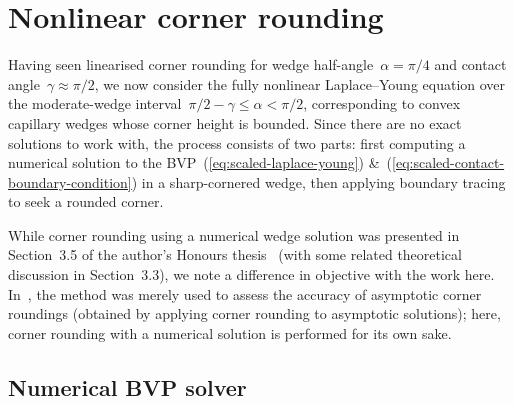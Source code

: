 \section{Nonlinear corner rounding}
\label{sec:moderate.nonlinear}

Having seen linearised corner rounding
for wedge half-angle~$\alpha = \pi/4$
and contact angle~$\gamma \approx \pi/2$,
we now consider the fully nonlinear Laplace--Young equation
over the moderate-wedge interval~$\pi/2 - \gamma \le \alpha < \pi/2$,
corresponding to convex capillary wedges whose corner height is bounded.
Since there are no exact solutions to work with,
the process consists of two parts:
first computing a numerical solution
to the BVP~(\ref{eq:scaled-laplace-young})
\&~(\ref{eq:scaled-contact-boundary-condition})
in a sharp-cornered wedge,
then applying boundary tracing to seek a rounded corner.

While corner rounding using a numerical wedge solution
was presented in Section~3.5
of the author's Honours thesis~\cite{li-2017-thesis-rounding-capillary-wedge}
(with some related theoretical discussion in Section~3.3),
we note a difference in objective with the work here.
In~\cite{li-2017-thesis-rounding-capillary-wedge},
the method was merely used
to assess the accuracy of asymptotic corner roundings
(obtained by applying corner rounding to asymptotic solutions);
here, corner rounding with a numerical solution
is performed for its own sake.

\subsection{Numerical BVP solver}
\label{sec:moderate.nonlinear.numerical}

